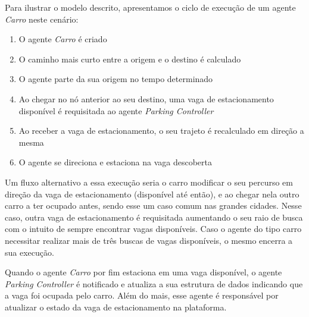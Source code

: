 Para ilustrar o modelo descrito, apresentamos o ciclo de execução de um agente \textit{Carro} neste cenário:

\begin{enumerate}
    \item O agente \textit{Carro} é criado

    \item O caminho mais curto entre a origem e o destino é calculado

    \item O agente parte da sua origem no tempo determinado

    \item Ao chegar no nó anterior ao seu destino, uma vaga de estacionamento disponível é requisitada ao agente \textit{Parking Controller}

    \item Ao receber a vaga de estacionamento, o seu trajeto é recalculado em direção a mesma

    \item O agente se direciona e estaciona na vaga descoberta 
\end{enumerate}

Um fluxo alternativo a essa execução seria o carro modificar o seu percurso em direção da vaga de estacionamento (disponível até então), e ao chegar nela outro
carro a ter ocupado antes, sendo esse um caso comum nas grandes cidades.
Nesse caso, outra vaga de estacionamento é requisitada aumentando o seu raio de busca com o intuito de sempre encontrar vagas disponíveis.
Caso o agente do tipo carro necessitar realizar mais de três buscas de vagas disponíveis, o mesmo encerra a sua execução.

Quando o agente \textit{Carro} por fim estaciona em uma vaga disponível, o agente \textit{Parking Controller} é notificado e atualiza a sua estrutura de dados indicando
que a vaga foi ocupada pelo carro.
Além do mais, esse agente é responsável por atualizar o estado da vaga de estacionamento na plataforma.

